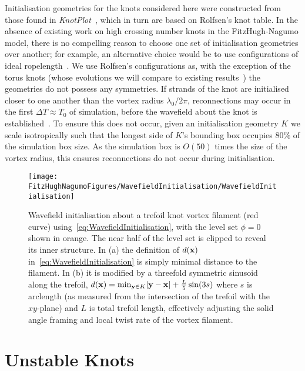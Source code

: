 Initialisation geometries for the knots considered here were constructed from those found in \emph{KnotPlot}~\citep{KnotPlot}, which in turn are based on Rolfsen's knot table. In the absence of existing work on high crossing number knots in the FitzHugh-Nagumo model, there is no compelling reason to choose one set of initialisation geometries over another; for example, an alternative choice would be to use configurations of ideal ropelength~\citep{Cantarella2011,Kleckner2016,Maucher2017}. We use Rolfsen's configurations as, with the exception of the torus knots (whose evolutions we will compare to existing results~\citep{Maucher2017}) the geometries do not possess any symmetries. If strands of the knot are initialised closer to one another than the vortex radius $\lambda_0 /2\pi$, reconnections may occur in the first $\Delta T \approx T_0$ of simulation, before the wavefield about the knot is established~\citep{Maucher2016}. To ensure this does not occur, given an initialisation geometry $K$ we scale isotropically such that the longest side of $K$'s bounding box occupies $80\%$ of the simulation box size. As the simulation box is $O(50)$ times the size of the vortex radius, this ensures reconnections do not occur during initialisation. 

\begin{figure}[htbp]
\centering
\texttt{[image: \\FitzHughNagumoFigures/WavefieldInitialisation/WavefieldInitialisation]}
  \caption[Initialising a wavefield around a trefoil vortex.]{Wavefield initialisation about a trefoil knot vortex filament (red curve) using~\eqref{eq:WavefieldInitialisation}, with the level set $\phi = 0 $ shown in orange. The near half of the level set is clipped to reveal its inner structure. In (a) the definition of $d({\bf x})$ in~\eqref{eq:WavefieldInitialisation} is simply minimal distance to the filament. In (b) it is modified by a threefold symmetric sinusoid along the trefoil, $d({\bf x})= \mathrm{min}_{{\bf y} \in K} |{\bf y}- {\bf x}| + \frac{L}{5}\sin(3s)$ where $s$ is arclength (as measured from the intersection of the trefoil with the $xy$-plane) and $L$ is total trefoil length, effectively adjusting the solid angle framing and local twist rate of the vortex filament.}
\label{fig:WavefieldInitialisation}
\end{figure}


\section{\label{sec:UnstableKnots}Unstable Knots}

